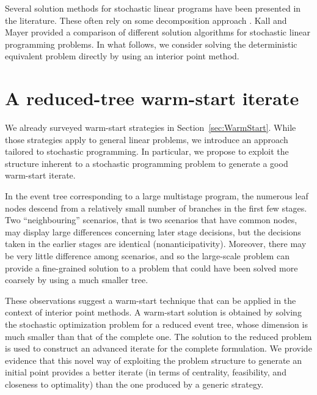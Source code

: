 Several solution methods for stochastic linear programs have been 
presented in the literature. These often rely on some decomposition
approach \cite{Birge85,LinderothWright03,MulveyRuszczynski}.
Kall and Mayer \cite{KallMayer} provided a comparison of different
solution algorithms for stochastic linear programming problems.
In what follows, we consider solving the deterministic equivalent
problem directly by using an interior point method.


%
%
\section{A reduced-tree warm-start iterate}
\label{sec:ReducedTree}

We already surveyed warm-start strategies in Section~\ref{sec:WarmStart}.
While those strategies apply to
general linear problems, we introduce an approach tailored to
stochastic programming. In particular, we propose to exploit the structure
inherent to a stochastic programming problem to generate a good 
warm-start iterate.

In the event tree corresponding to a large multistage program, 
the numerous leaf nodes descend from a relatively small number of 
branches in the first few stages. Two ``neighbouring'' scenarios, 
that is two scenarios that have common nodes, may display large 
differences concerning later stage decisions, but the decisions 
taken in the earlier stages are identical (nonanticipativity).
Moreover, there may be very little difference among 
scenarios, and so the large-scale problem can provide a fine-grained 
solution to a problem that could have been solved more coarsely by 
using a much smaller tree. 

These observations suggest a
warm-start technique that can be applied in the context of interior 
point methods. A warm-start solution is obtained by solving the 
stochastic optimization problem for a reduced event tree, whose 
dimension is much smaller than that of the complete one. The solution 
to the reduced problem is used to construct an advanced iterate for 
the complete formulation. We provide evidence that this novel way 
of exploiting the problem structure to generate an initial point 
provides a better iterate (in terms of centrality, feasibility, 
and closeness to optimality) than the one produced by a generic 
strategy.

